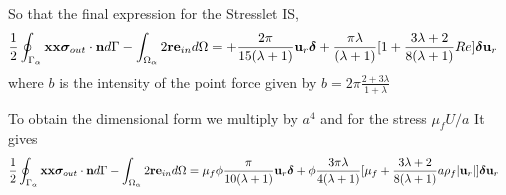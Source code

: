 So that the final expression for the Stresslet IS, 
\begin{align}
    \frac{1}{2}\oint_{\Gamma_{\alpha}} \textbf{xx}\bm\sigma_{out}\cdot \textbf{n} d\Gamma
    - \int_{\Omega_{\alpha}} 2\textbf{r}\textbf{e}_{in} d\Omega &=
    +\frac{2\pi}{15(\lambda +1)} \textbf{u}_r \bm\delta
    + \frac{\pi \lambda }{(\lambda+1)}
    [
        1
        +
        \frac{3\lambda+2}{8(\lambda+1)} Re 
    ]\bm\delta \textbf{u}_r 
\end{align}
where $b$ is the intensity of the point force given by $b = 2 \pi \frac{2+3\lambda}{1+\lambda}$


To obtain the dimensional form we multiply by $a^4$ and for the stress $\mu_f U/a$
It gives 
\begin{align}
    \frac{1}{2}\oint_{\Gamma_{\alpha}} \textbf{xx}\bm\sigma_{out}\cdot \textbf{n} d\Gamma
    - \int_{\Omega_{\alpha}} 2\textbf{r}\textbf{e}_{in} d\Omega &=
    \mu_f \phi  \frac{\pi}{10(\lambda +1)} \textbf{u}_r \bm\delta
    +\phi  \frac{3\pi \lambda }{4(\lambda+1)}
    [
        \mu_f  
        +
        \frac{3\lambda+2}{8(\lambda+1)} 
        a \rho_f |\textbf{u}_r|
    ]\bm\delta \textbf{u}_r 
\end{align}

